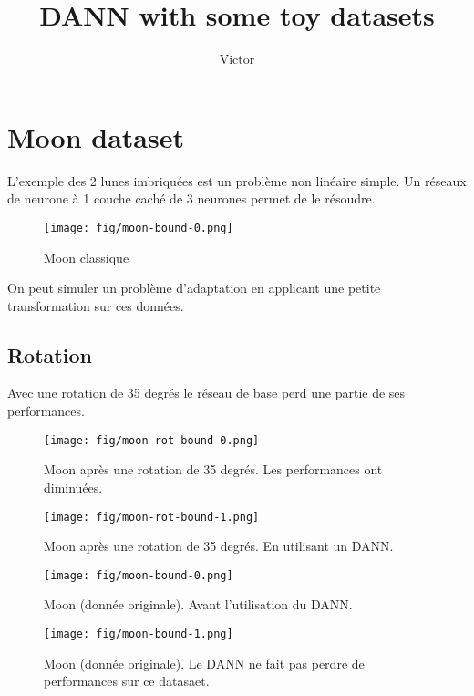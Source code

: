 \documentclass[]{article}
\title{DANN with some toy datasets}
\author{Victor}
\date{}
\begin{document}
\maketitle

{
\hypersetup{linkcolor=black}
\setcounter{tocdepth}{3}
\tableofcontents
}
\section{Moon dataset}\label{moon-dataset}

L'exemple des 2 lunes imbriquées est un problème non linéaire simple. Un
réseaux de neurone à 1 couche caché de 3 neurones permet de le résoudre.

\begin{figure}[htbp]
\centering
\texttt{[image: fig/moon-bound-0.png]}
\caption{Moon classique}
\end{figure}


On peut simuler un problème d'adaptation en applicant une petite
transformation sur ces données.

\subsection{Rotation}\label{rotation}

Avec une rotation de 35 degrés le réseau de base perd une partie de ses
performances.

\begin{figure*}[htbp]
\centering
\begin{subfigure}[htbp]{.45\textwidth}
\centering
\texttt{[image: fig/moon-rot-bound-0.png]}
\caption{Moon après une rotation de 35 degrés. Les performances ont
diminuées.}
\end{subfigure}
\begin{subfigure}[htbp]{.45\textwidth}
\centering
\texttt{[image: fig/moon-rot-bound-1.png]}
\caption{Moon après une rotation de 35 degrés. En utilisant un DANN.}
\end{subfigure}
\end{figure*}


\begin{figure*}[htbp]
\centering
\begin{subfigure}[htbp]{.45\textwidth}
\centering
\texttt{[image: fig/moon-bound-0.png]}
\caption{Moon (donnée originale). Avant l'utilisation du DANN.}
\end{subfigure}
\begin{subfigure}[htbp]{.45\textwidth}
\centering
\texttt{[image: fig/moon-bound-1.png]}
\caption{Moon (donnée originale). Le DANN ne fait pas perdre de
performances sur ce datasaet.}
\end{subfigure}
\caption{En applicant un DANN on peut partiellement corriger ce problème
($\lambda_D=0.7$)}
\end{figure*}
\end{document}
